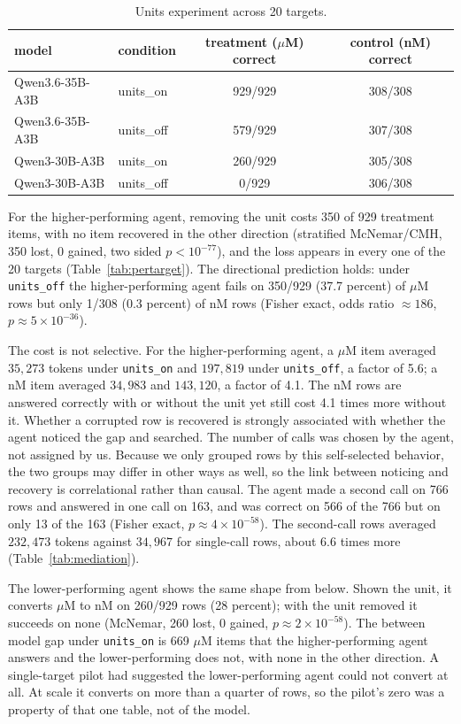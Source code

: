 \documentclass[sigconf]{ceurart}
\begin{document}
\begin{table}[t]
\centering
\caption{Units experiment across 20 targets.}
\label{tab:units}
\begin{tabular}{llcc}
\toprule
model & condition & treatment ($\mu$M) correct & control (nM) correct \\
\midrule
Qwen3.6-35B-A3B & units\_on  & 929/929 & 308/308 \\
Qwen3.6-35B-A3B & units\_off & 579/929 & 307/308 \\
Qwen3-30B-A3B   & units\_on  & 260/929 & 305/308 \\
Qwen3-30B-A3B   & units\_off & 0/929   & 306/308 \\
\bottomrule
\end{tabular}
\end{table}

For the higher-performing agent, removing the unit costs 350 of 929 treatment
items, with no item recovered in the other direction (stratified McNemar/CMH, 350
lost, 0 gained, two sided $p < 10^{-77}$), and the loss appears in every one of the
20 targets (Table~\ref{tab:pertarget}). The directional prediction holds: under
\texttt{units\_off} the higher-performing agent fails on 350/929 (37.7 percent) of
$\mu$M rows but only 1/308 (0.3 percent) of nM rows (Fisher exact, odds ratio
$\approx 186$, $p \approx 5\times10^{-36}$).

The cost is not selective. For the higher-performing agent, a $\mu$M item averaged
$35{,}273$ tokens under \texttt{units\_on} and $197{,}819$ under \texttt{units\_off},
a factor of 5.6; a nM item averaged $34{,}983$ and $143{,}120$, a factor of 4.1. The
nM rows are answered correctly with or without the unit yet still cost 4.1 times
more without it. Whether a corrupted row is recovered is strongly associated with
whether the agent noticed the gap and searched. The number of calls was chosen by the agent, not assigned by us. Because we only
grouped rows by this self-selected behavior, the two groups may differ in other ways
as well, so the link between noticing and recovery is correlational rather than
causal. The agent made a second call on 766 rows and
answered in one call on 163, and was correct on 566 of the 766 but on only 13 of
the 163 (Fisher exact, $p \approx 4\times10^{-58}$). The second-call rows averaged
$232{,}473$ tokens against $34{,}967$ for single-call rows, about 6.6 times more
(Table~\ref{tab:mediation}).

The lower-performing agent shows the same shape from below. Shown the unit, it
converts $\mu$M to nM on 260/929 rows (28 percent); with the unit removed it succeeds
on none (McNemar, 260 lost, 0 gained, $p \approx 2\times10^{-58}$). The between
model gap under \texttt{units\_on} is 669 $\mu$M items that the higher-performing agent
answers and the lower-performing does not, with none in the other direction. A
single-target pilot had suggested the lower-performing agent could not convert at
all. At scale it converts on more than a quarter of rows, so the pilot's zero was a
property of that one table, not of the model.
\end{document}
